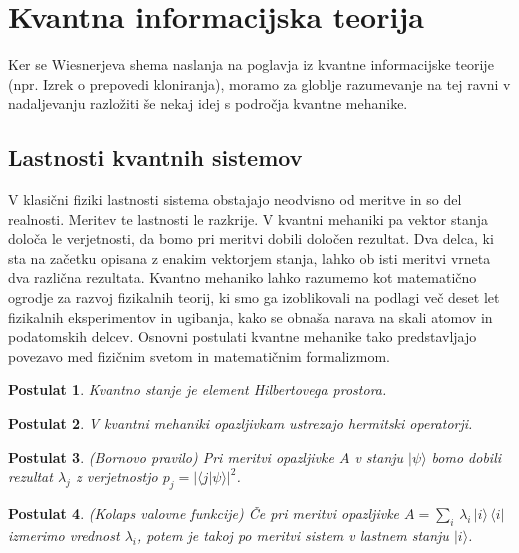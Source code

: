 \documentclass[12pt]{article}
\newtheorem{postulat}{Postulat}
\begin{document}
\section{Kvantna informacijska teorija}
\par Ker se Wiesnerjeva shema naslanja na poglavja iz kvantne informacijske teorije (npr. Izrek o prepovedi kloniranja), moramo za globlje razumevanje na tej ravni v nadaljevanju razložiti še nekaj idej s področja kvantne mehanike.

\subsection{Lastnosti kvantnih sistemov}

V klasični fiziki lastnosti sistema obstajajo neodvisno od meritve in so del realnosti. Meritev te lastnosti le razkrije. V kvantni mehaniki pa vektor stanja določa le verjetnosti, da bomo pri meritvi dobili določen rezultat. Dva delca, ki sta na začetku opisana z enakim vektorjem stanja, lahko ob isti meritvi vrneta dva različna rezultata. Kvantno mehaniko lahko razumemo kot matematično ogrodje za razvoj fizikalnih teorij, ki smo ga izoblikovali na podlagi več deset let fizikalnih eksperimentov in ugibanja, kako se obnaša narava na skali atomov in podatomskih delcev. Osnovni postulati kvantne mehanike tako predstavljajo povezavo med fizičnim svetom in matematičnim formalizmom. \cite{zitkoKvantneRacunalniskeTehnologije2017}

\begin{postulat}
Kvantno stanje je element Hilbertovega prostora.
\end{postulat}

\begin{postulat}
V kvantni mehaniki opazljivkam ustrezajo hermitski operatorji.
\end{postulat}

\begin{postulat}
(Bornovo pravilo) Pri meritvi opazljivke $A$ v stanju $| \psi \rangle$ bomo dobili rezultat $\lambda_j$ z verjetnostjo $p_j = | \langle j | \psi \rangle |^2$.
\end{postulat}

\begin{postulat}
(Kolaps valovne funkcije) Če pri meritvi opazljivke $A = \sum_i \, \lambda_i \, | i \rangle \, \langle i |$ izmerimo vrednost $\lambda_i$, potem je takoj po meritvi sistem v lastnem stanju $| i \rangle$.
\end{postulat}
\end{document}
